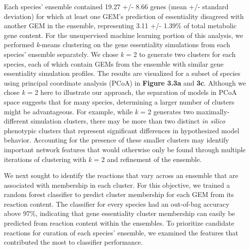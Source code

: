 \documentclass[11pt,onecolumn,notitlepage,openany,twoside]{book}
\begin{document}
\begin{refsection}
Each species’ ensemble contained 19.27 +/- 8.66 genes (mean +/- standard deviation) for which at least one GEM’s prediction of essentiality disagreed with another GEM in the ensemble, representing 3.11 +/- 1.39\% of total metabolic gene content. For the unsupervised machine learning portion of this analysis, we performed \textit{k}-means clustering on the gene essentiality simulations from each species’ ensemble separately. We chose \textit{k} = 2 to generate two clusters for each species, each of which contain GEMs from the ensemble with similar gene essentiality simulation profiles. The results are visualized for a subset of species using principal coordinate analysis (PCoA) in \textbf{Figure 3.3a} and \textbf{3c}. Although we chose \textit{k} = 2 here to illustrate our approach, the separation of models in PCoA space suggests that for many species, determining a larger number of clusters might be advantageous. For example, while \textit{k} = 2 generates two maximally-different simulation clusters, there may be more than two distinct \textit{in silico} phenotypic clusters that represent significant differences in hypothesized model behavior. Accounting for the presence of these smaller clusters may identify important network features that would otherwise only be found through multiple iterations of clustering with \textit{k} = 2 and refinement of the ensemble.

We next sought to identify the reactions that vary across an ensemble that are associated with membership in each cluster. For this objective, we trained a random forest classifier \cite{Breiman2001-pl} to predict cluster membership for each GEM from its reaction content. The classifier for every species had an out-of-bag accuracy above 97\%, indicating that gene essentiality cluster membership can easily be predicted from reaction content within the ensembles. To prioritize candidate reactions for curation of each species’ ensemble, we examined the features that contributed the most to classifier performance.


\end{refsection}
\end{document}
